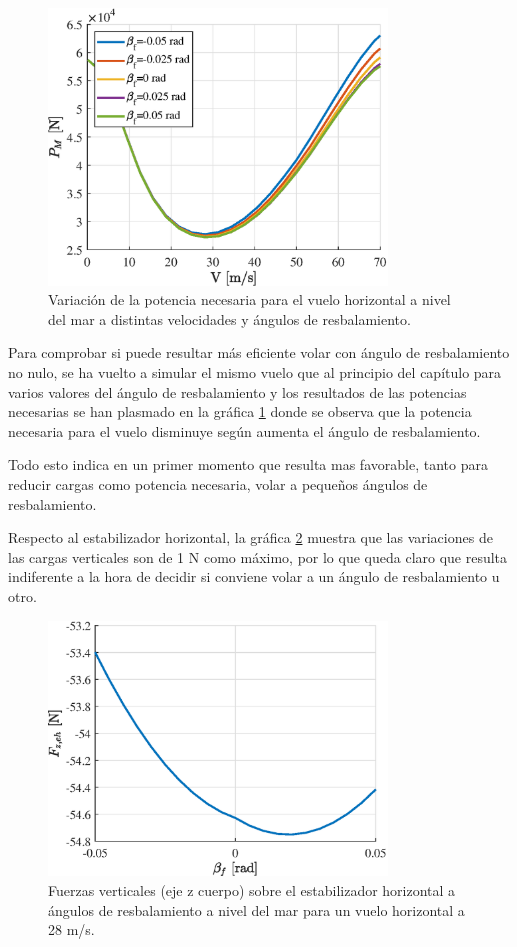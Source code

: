 \begin{figure}
	\centering
	\includegraphics[width=90mm]{graficos/Potb}
	\caption{Variación de la potencia necesaria para el vuelo horizontal a nivel del mar a distintas velocidades y ángulos de resbalamiento.}
	\label{Potb}
\end{figure}

Para comprobar si puede resultar más eficiente volar con ángulo de resbalamiento no nulo, se ha vuelto a simular el mismo vuelo que al principio del capítulo para varios valores del ángulo de resbalamiento y los resultados de las potencias necesarias se han plasmado en la gráfica \ref{Potb} donde se observa que la potencia necesaria para el vuelo disminuye según aumenta el ángulo de resbalamiento.

Todo esto indica en un primer momento que resulta mas favorable, tanto para reducir cargas como potencia necesaria, volar a pequeños ángulos de resbalamiento.

Respecto al estabilizador horizontal, la gráfica \ref{FEHb} muestra que las variaciones de las cargas verticales son de 1 N como máximo, por lo que queda claro que resulta indiferente a la hora de decidir si conviene volar a un ángulo de resbalamiento u otro.


\begin{figure}
	\centering
	\includegraphics[width=90mm]{graficos/FEHb}
	\caption{Fuerzas verticales (eje z cuerpo) sobre el estabilizador horizontal a ángulos de resbalamiento a nivel del mar para un vuelo horizontal a 28 m/s.}
	\label{FEHb}
\end{figure}

